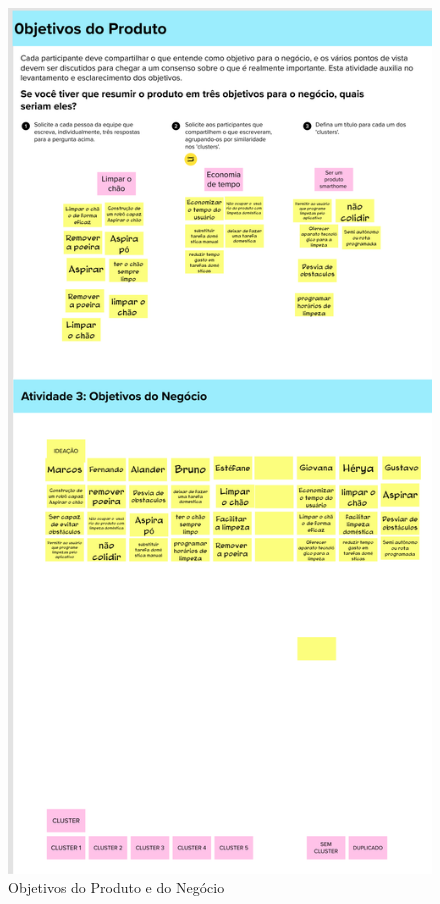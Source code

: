 \begin{anexosenv}
\begin{figure}[H]
\centering
\includegraphics[height=\textheight]{figuras/Lean Inception/Mural - Objetivos do Produto.png}
\caption{Objetivos do Produto e do Negócio}
\label{objetivos produto}
\end{figure}


\end{anexosenv}

